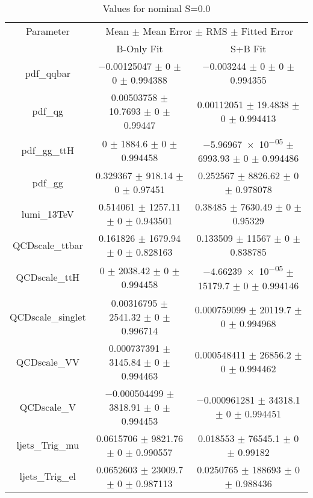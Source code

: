 \begin{table}
\centering
\caption{Values for nominal S=0.0}
\begin{tabular}{ccc}
\toprule
Parameter & \multicolumn{2}{c}{Mean $\pm$ Mean Error $\pm$ RMS $\pm$ Fitted Error}\\
 & B-Only Fit & S+B Fit\\
\midrule
pdf\_qqbar & \num{-0.00125047} $\pm$ \num{0} $\pm$ \num{0} $\pm$ \num{0.994388} & \num{-0.003244} $\pm$ \num{0} $\pm$ \num{0} $\pm$ \num{0.994355}\\
pdf\_qg & \num{0.00503758} $\pm$ \num{10.7693} $\pm$ \num{0} $\pm$ \num{0.99447} & \num{0.00112051} $\pm$ \num{19.4838} $\pm$ \num{0} $\pm$ \num{0.994413}\\
pdf\_gg\_ttH & \num{0} $\pm$ \num{1884.6} $\pm$ \num{0} $\pm$ \num{0.994458} & \num{-5.96967e-05} $\pm$ \num{6993.93} $\pm$ \num{0} $\pm$ \num{0.994486}\\
pdf\_gg & \num{0.329367} $\pm$ \num{918.14} $\pm$ \num{0} $\pm$ \num{0.97451} & \num{0.252567} $\pm$ \num{8826.62} $\pm$ \num{0} $\pm$ \num{0.978078}\\
lumi\_13TeV & \num{0.514061} $\pm$ \num{1257.11} $\pm$ \num{0} $\pm$ \num{0.943501} & \num{0.38485} $\pm$ \num{7630.49} $\pm$ \num{0} $\pm$ \num{0.95329}\\
QCDscale\_ttbar & \num{0.161826} $\pm$ \num{1679.94} $\pm$ \num{0} $\pm$ \num{0.828163} & \num{0.133509} $\pm$ \num{11567} $\pm$ \num{0} $\pm$ \num{0.838785}\\
QCDscale\_ttH & \num{0} $\pm$ \num{2038.42} $\pm$ \num{0} $\pm$ \num{0.994458} & \num{-4.66239e-05} $\pm$ \num{15179.7} $\pm$ \num{0} $\pm$ \num{0.994146}\\
QCDscale\_singlet & \num{0.00316795} $\pm$ \num{2541.32} $\pm$ \num{0} $\pm$ \num{0.996714} & \num{0.000759099} $\pm$ \num{20119.7} $\pm$ \num{0} $\pm$ \num{0.994968}\\
QCDscale\_VV & \num{0.000737391} $\pm$ \num{3145.84} $\pm$ \num{0} $\pm$ \num{0.994463} & \num{0.000548411} $\pm$ \num{26856.2} $\pm$ \num{0} $\pm$ \num{0.994462}\\
QCDscale\_V & \num{-0.000504499} $\pm$ \num{3818.91} $\pm$ \num{0} $\pm$ \num{0.994453} & \num{-0.000961281} $\pm$ \num{34318.1} $\pm$ \num{0} $\pm$ \num{0.994451}\\
ljets\_Trig\_mu & \num{0.0615706} $\pm$ \num{9821.76} $\pm$ \num{0} $\pm$ \num{0.990557} & \num{0.018553} $\pm$ \num{76545.1} $\pm$ \num{0} $\pm$ \num{0.99182}\\
ljets\_Trig\_el & \num{0.0652603} $\pm$ \num{23009.7} $\pm$ \num{0} $\pm$ \num{0.987113} & \num{0.0250765} $\pm$ \num{188693} $\pm$ \num{0} $\pm$ \num{0.988436}\\

\end{tabular}
\end{table}
